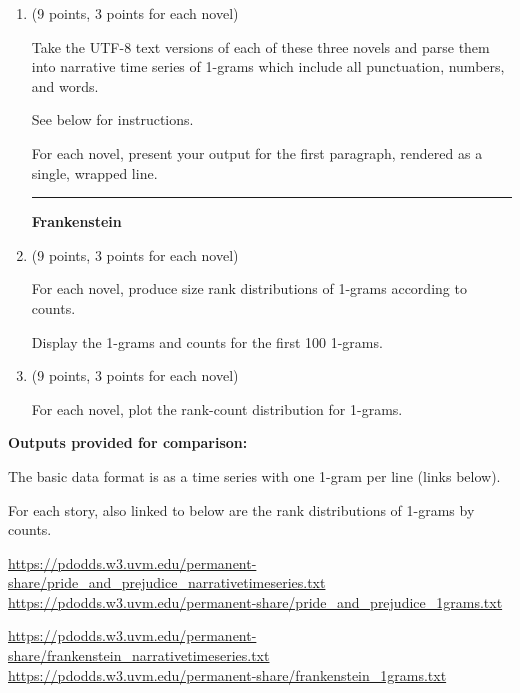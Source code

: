 \begin{enumerate}
\item (9 points, 3 points for each novel)

  Take the UTF-8 text versions of each of these three novels
  and parse them into narrative time series of 1-grams
  which include all punctuation, numbers, and words.

  See below for instructions.

  For each novel,
  present your output for the first paragraph, rendered as a single, wrapped line.
  
 \vspace{1em}

\hrule

\vspace{1em}

\textbf{Frankenstein}



\item (9 points, 3 points for each novel)

  For each novel, produce size rank distributions of 1-grams according to counts.

  Display the 1-grams and counts for the first 100 1-grams.
  
\item (9 points, 3 points for each novel)

  For each novel, plot the rank-count distribution for 1-grams.
\end{enumerate}

\textbf{Outputs provided for comparison:}

The basic data format is as a time series with one 1-gram per line (links below).

For each story, also linked to below are the rank distributions of 1-grams by counts.

\url{https://pdodds.w3.uvm.edu/permanent-share/pride_and_prejudice_narrativetimeseries.txt}\\
\url{https://pdodds.w3.uvm.edu/permanent-share/pride_and_prejudice_1grams.txt}

\url{https://pdodds.w3.uvm.edu/permanent-share/frankenstein_narrativetimeseries.txt}\\
\url{https://pdodds.w3.uvm.edu/permanent-share/frankenstein_1grams.txt}


